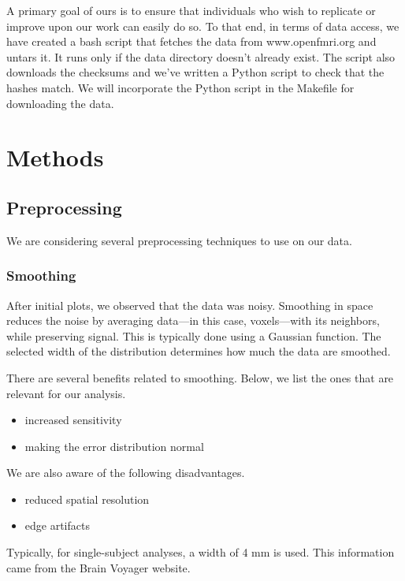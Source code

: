 \documentclass[11pt]{article}
\begin{document}
A primary goal of ours is to ensure that individuals who wish to replicate or
improve upon our work can easily do so. To that end, in terms of data access,
we have created a bash script that fetches the data from www.openfmri.org and
untars it. It runs only if the data directory doesn't already exist. The script
also downloads the checksums and we've written a Python script to check that
the hashes match. We will incorporate the Python script in the Makefile for
downloading the data.

\section{Methods}

\subsection{Preprocessing}

We are considering several preprocessing techniques to use on our data.

\subsubsection{Smoothing}

After initial plots, we observed that the data was noisy. Smoothing in space
reduces the noise by averaging data---in this case, voxels---with its
neighbors, while preserving signal. This is typically done using a Gaussian
function. The selected width of the distribution determines how much the data
are smoothed.

There are several benefits related to smoothing. Below, we list the ones that
are relevant for our analysis.

\begin{itemize}
  \item increased sensitivity
  \item making the error distribution normal
\end{itemize}

We are also aware of the following disadvantages.

\begin{itemize}
  \item{reduced spatial resolution}
  \item{edge artifacts}
\end{itemize}

Typically, for single-subject analyses, a width of 4 mm is used. This
information came from the Brain Voyager website\cite{bvsmoothing}.
\end{document}

